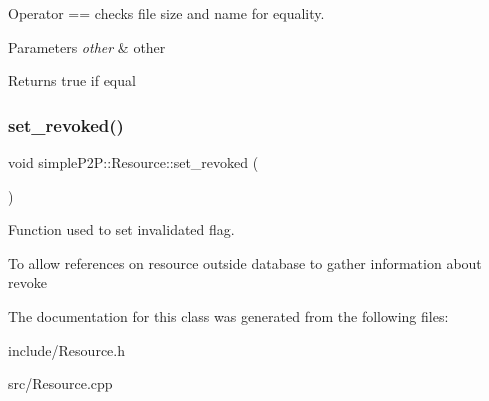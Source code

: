 Operator == checks file size and name for equality. 


\begin{DoxyParams}{Parameters}
{\em other} & other \\
\hline
\end{DoxyParams}
\begin{DoxyReturn}{Returns}
true if equal 
\end{DoxyReturn}
\mbox{\label{classsimpleP2P_1_1Resource_a49e46561e4088f78bb96c07c12d4738c}} 
\subsubsection{\texorpdfstring{set\+\_\+revoked()}{set\_revoked()}}
{\footnotesize\ttfamily void simple\+P2\+P\+::\+Resource\+::set\+\_\+revoked (\begin{DoxyParamCaption}{ }\end{DoxyParamCaption})}



Function used to set invalidated flag. 

To allow references on resource outside database to gather information about revoke 

The documentation for this class was generated from the following files\+:\begin{DoxyCompactItemize}
\item 
include/Resource.\+h\item 
src/Resource.\+cpp\end{DoxyCompactItemize}
